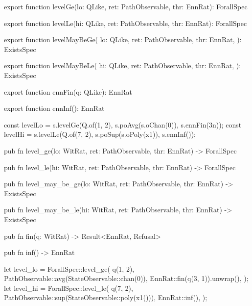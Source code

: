 \begin{tssrc}
export function levelGe(lo: QLike, ret: PathObservable, thr: EnnRat): ForallSpec

export function levelLe(hi: QLike, ret: PathObservable, thr: EnnRat): ForallSpec

export function levelMayBeGe(
  lo: QLike,
  ret: PathObservable,
  thr: EnnRat,
): ExistsSpec

export function levelMayBeLe(
  hi: QLike,
  ret: PathObservable,
  thr: EnnRat,
): ExistsSpec

export function ennFin(q: QLike): EnnRat

export function ennInf(): EnnRat
\end{tssrc}
\begin{tssrc}
const levelLo = s.levelGe(Q.of(1, 2), s.poAvg(s.oChan(0)), s.ennFin(3n));
const levelHi = s.levelLe(Q.of(7, 2), s.poSup(s.oPoly(x1)), s.ennInf());
\end{tssrc}
\begin{rustsrc}
pub fn level_ge(lo: WitRat, ret: PathObservable, thr: EnnRat) -> ForallSpec

pub fn level_le(hi: WitRat, ret: PathObservable, thr: EnnRat) -> ForallSpec

pub fn level_may_be_ge(lo: WitRat, ret: PathObservable, thr: EnnRat) -> ExistsSpec

pub fn level_may_be_le(hi: WitRat, ret: PathObservable, thr: EnnRat) -> ExistsSpec

pub fn fin(q: WitRat) -> Result<EnnRat, Refusal>

pub fn inf() -> EnnRat
\end{rustsrc}
\begin{rustsrc}
let level_lo = ForallSpec::level_ge(
    q(1, 2),
    PathObservable::avg(StateObservable::chan(0)),
    EnnRat::fin(q(3, 1)).unwrap(),
);
let level_hi = ForallSpec::level_le(
    q(7, 2),
    PathObservable::sup(StateObservable::poly(x1())),
    EnnRat::inf(),
);
\end{rustsrc}
